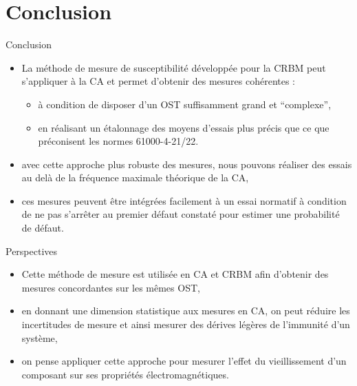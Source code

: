 \documentclass[]{beamer}
\begin{document}
\section{Conclusion}
\begin{frame}{Conclusion}
\begin{itemize}
    \item La méthode de mesure de susceptibilité développée pour la CRBM \cite{Amador13} peut s'appliquer à la CA et permet d'obtenir des mesures cohérentes :
	\begin{itemize}
	\item à condition  de disposer d'un OST suffisamment grand et ``complexe'',
	\item en réalisant un étalonnage des moyens d'essais plus précis que ce que préconisent les normes 61000-4-21/22.
	\end{itemize}
    \item avec cette approche plus robuste des mesures, nous pouvons réaliser des essais au delà de la fréquence maximale théorique de la CA,
    \item ces mesures peuvent être intégrées facilement à un essai normatif à condition de ne pas s'arrêter au premier défaut constaté pour estimer une probabilité de défaut.
\end{itemize}
\end{frame}
\begin{frame}{Perspectives}
\begin{itemize}
    \item Cette méthode de mesure est utilisée en CA et CRBM afin d'obtenir des mesures concordantes sur les mêmes OST,
    \item en donnant une dimension statistique aux mesures en CA, on peut réduire les incertitudes de mesure et ainsi mesurer des dérives légères de l'immunité d'un système, 
    \item on pense appliquer cette approche pour mesurer l'effet du vieillissement d'un composant sur ses propriétés électromagnétiques.
\end{itemize}
\end{frame}
\end{document}
